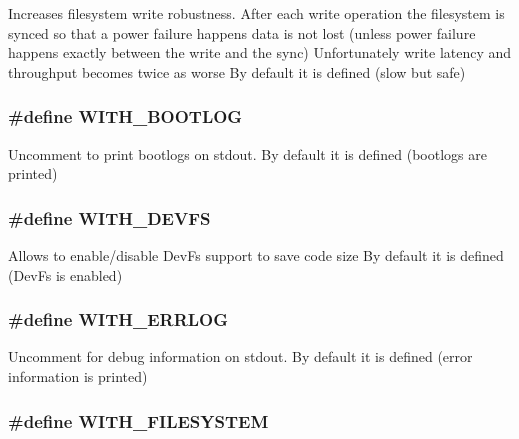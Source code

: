 Increases filesystem write robustness. After each write operation the filesystem is synced so that a power failure happens data is not lost (unless power failure happens exactly between the write and the sync) Unfortunately write latency and throughput becomes twice as worse By default it is defined (slow but safe) \hypertarget{group___settings_ga2c6b4dab3da5b7b77fef128e1cd2fa79}{
\subsubsection[{W\-I\-T\-H\-\_\-\-B\-O\-O\-T\-L\-O\-G}]{\setlength{\rightskip}{0pt plus 5cm}\#define W\-I\-T\-H\-\_\-\-B\-O\-O\-T\-L\-O\-G}}\label{group___settings_ga2c6b4dab3da5b7b77fef128e1cd2fa79}
Uncomment to print bootlogs on stdout. By default it is defined (bootlogs are printed) \hypertarget{group___settings_gaf64dde14bdcb62760cbffd5a0b050fb5}{
\subsubsection[{W\-I\-T\-H\-\_\-\-D\-E\-V\-F\-S}]{\setlength{\rightskip}{0pt plus 5cm}\#define W\-I\-T\-H\-\_\-\-D\-E\-V\-F\-S}}\label{group___settings_gaf64dde14bdcb62760cbffd5a0b050fb5}
Allows to enable/disable Dev\-Fs support to save code size By default it is defined (Dev\-Fs is enabled) \hypertarget{group___settings_ga77cf94725c645792e686ff791e47d703}{
\subsubsection[{W\-I\-T\-H\-\_\-\-E\-R\-R\-L\-O\-G}]{\setlength{\rightskip}{0pt plus 5cm}\#define W\-I\-T\-H\-\_\-\-E\-R\-R\-L\-O\-G}}\label{group___settings_ga77cf94725c645792e686ff791e47d703}
Uncomment for debug information on stdout. By default it is defined (error information is printed) \hypertarget{group___settings_ga35c68f7b13770080cccce5baafc24a30}{
\subsubsection[{W\-I\-T\-H\-\_\-\-F\-I\-L\-E\-S\-Y\-S\-T\-E\-M}]{\setlength{\rightskip}{0pt plus 5cm}\#define W\-I\-T\-H\-\_\-\-F\-I\-L\-E\-S\-Y\-S\-T\-E\-M}}\label{group___settings_ga35c68f7b13770080cccce5baafc24a30}
